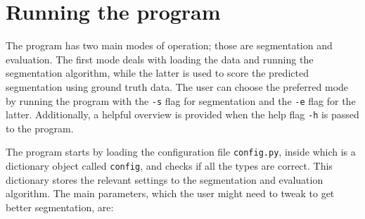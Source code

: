\documentclass[
  digital,     %
  oneside,     %
  nosansbold,  %
  nocolorbold, %
  lof,         %
  lot,         %
]{fithesis4}
\begin{document}
\section{Running the program}

The program has two main modes of operation; those are segmentation and
evaluation. The first mode deals with loading the data and running the
segmentation algorithm, while the latter is used to score the predicted
segmentation using ground truth data. The user can choose the preferred
mode by running the program with the \texttt{-s} flag for segmentation and the
\texttt{-e} flag for the latter. Additionally, a helpful overview is
provided when the help flag \texttt{-h} is passed to the program.

The program starts by loading the configuration file \texttt{config.py}, inside
which is a dictionary object called \texttt{config}, and checks if all the types are
correct. This dictionary stores the
relevant settings to the segmentation and evaluation algorithm. The main parameters, which the
user might need to tweak to get better segmentation, are:
\end{document}
